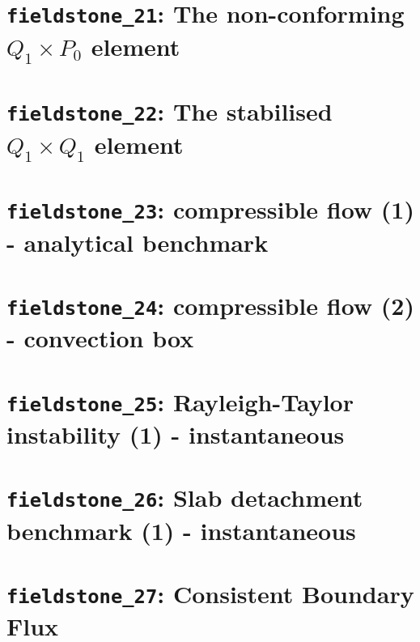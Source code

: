 \documentclass[a4paper]{article}
\begin{document}
\newpage
\section{{\tt fieldstone\_21}: The non-conforming $Q_1 \times P_0$ element \label{f21}}


\newpage
\section{{\tt fieldstone\_22}: The stabilised $Q_1 \times Q_1$ element \label{f22}} 


\newpage
\section{{\tt fieldstone\_23}: compressible flow (1) - analytical benchmark \label{f23}}


\newpage
\section{{\tt fieldstone\_24}: compressible flow (2) - convection box \label{f24}}


\newpage
\section{{\tt fieldstone\_25}: Rayleigh-Taylor instability (1) - instantaneous \label{f25}}


\newpage
\section{{\tt fieldstone\_26}: Slab detachment benchmark (1) - instantaneous \label{f26}}


\newpage
\section{{\tt fieldstone\_27}: Consistent Boundary Flux \label{f27}}

\end{document}
